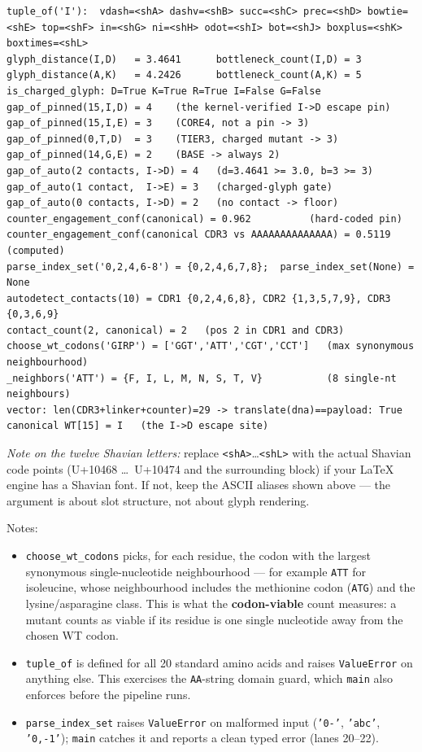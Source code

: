 \documentclass{article}
\begin{document}
\begin{lstlisting}
tuple_of('I'):  vdash=<shA> dashv=<shB> succ=<shC> prec=<shD> bowtie=<shE> top=<shF> in=<shG> ni=<shH> odot=<shI> bot=<shJ> boxplus=<shK> boxtimes=<shL>
glyph_distance(I,D)   = 3.4641      bottleneck_count(I,D) = 3
glyph_distance(A,K)   = 4.2426      bottleneck_count(A,K) = 5
is_charged_glyph: D=True K=True R=True I=False G=False
gap_of_pinned(15,I,D) = 4    (the kernel-verified I->D escape pin)
gap_of_pinned(15,I,E) = 3    (CORE4, not a pin -> 3)
gap_of_pinned(0,T,D)  = 3    (TIER3, charged mutant -> 3)
gap_of_pinned(14,G,E) = 2    (BASE -> always 2)
gap_of_auto(2 contacts, I->D) = 4   (d=3.4641 >= 3.0, b=3 >= 3)
gap_of_auto(1 contact,  I->E) = 3   (charged-glyph gate)
gap_of_auto(0 contacts, I->D) = 2   (no contact -> floor)
counter_engagement_conf(canonical) = 0.962          (hard-coded pin)
counter_engagement_conf(canonical CDR3 vs AAAAAAAAAAAAAA) = 0.5119  (computed)
parse_index_set('0,2,4,6-8') = {0,2,4,6,7,8};  parse_index_set(None) = None
autodetect_contacts(10) = CDR1 {0,2,4,6,8}, CDR2 {1,3,5,7,9}, CDR3 {0,3,6,9}
contact_count(2, canonical) = 2   (pos 2 in CDR1 and CDR3)
choose_wt_codons('GIRP') = ['GGT','ATT','CGT','CCT']   (max synonymous neighbourhood)
_neighbors('ATT') = {F, I, L, M, N, S, T, V}           (8 single-nt neighbours)
vector: len(CDR3+linker+counter)=29 -> translate(dna)==payload: True
canonical WT[15] = I   (the I->D escape site)
\end{lstlisting}

\noindent\textit{Note on the twelve Shavian letters:} replace
\texttt{<shA>}\dots\texttt{<shL>} with the actual Shavian code points
(U+10468 \dots\ U+10474 and the surrounding block) if your LaTeX engine has a
Shavian font. If not, keep the ASCII aliases shown above --- the argument is
about slot structure, not about glyph rendering.

Notes:

\begin{itemize}
  \item \texttt{choose\_wt\_codons} picks, for each residue, the codon with the
        largest synonymous single-nucleotide neighbourhood --- for example
        \texttt{ATT} for isoleucine, whose neighbourhood includes the methionine
        codon (\texttt{ATG}) and the lysine/asparagine class. This is what the
        \textbf{codon-viable} count measures: a mutant counts as viable if its
        residue is one single nucleotide away from the chosen WT codon.
  \item \texttt{tuple\_of} is defined for all 20 standard amino acids and raises
        \texttt{ValueError} on anything else. This exercises the \texttt{AA}-string
        domain guard, which \texttt{main} also enforces before the pipeline runs.
  \item \texttt{parse\_index\_set} raises \texttt{ValueError} on malformed input
        (\texttt{'0-'}, \texttt{'abc'}, \texttt{'0,-1'}); \texttt{main} catches it
        and reports a clean typed error (lanes 20--22).
\end{itemize}
\end{document}
